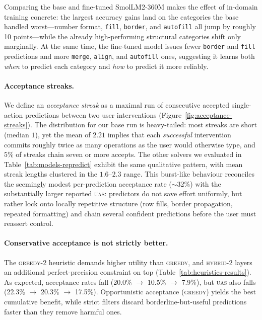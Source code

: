 \documentclass{article}
\newcommand{\op}[1]{\texttt{\small #1}}
\theoremstyle{plain}
\theoremstyle{definition}
\theoremstyle{remark}
\begin{document}
Comparing the base and fine-tuned SmolLM2-360M makes the effect of in-domain training concrete: the largest accuracy gains land on the categories the base handled worst---number format, \op{fill}, \op{border}, and \op{autofill} all jump by roughly 10 points---while the already high-performing structural categories shift only marginally.
At the same time, the fine-tuned model issues fewer \op{border} and \op{fill} predictions and more \op{merge}, \op{align}, and \op{autofill} ones, suggesting it learns both \emph{when} to predict each category and \emph{how} to predict it more reliably.



\paragraph{Acceptance streaks.}
We define an \emph{acceptance streak} as a maximal run of consecutive accepted single-action predictions between two user interventions (Figure~\ref{fig:acceptance-streaks}). The distribution for our base run is heavy-tailed: most streaks are short (median $1$), yet the mean of $2.21$ implies that each \emph{successful} intervention commits roughly twice as many operations as the user would otherwise type, and $5\%$ of streaks chain seven or more accepts. The other solvers we evaluated in Table~\ref{tab:models-repredict} exhibit the same qualitative pattern, with mean streak lengths clustered in the $1.6$--$2.3$ range. This burst-like behaviour reconciles the seemingly modest per-prediction acceptance rate ($\sim$32\%) with the substantially larger reported \textsc{uas}: predictors do not save effort uniformly, but rather lock onto locally repetitive structure (row fills, border propagation, repeated formatting) and chain several confident predictions before the user must reassert control.




\paragraph{Conservative acceptance is not strictly better.}

The \textsc{greedy-2} heuristic demands higher utility than \textsc{greedy}, and \textsc{hybrid-2} layers an additional perfect-precision constraint on top (Table~\ref{tab:heuristics-results}).
As expected, acceptance rates fall (20.0\% $\to$ 10.5\% $\to$ 7.9\%), but \textsc{uas} also falls (22.3\% $\to$ 20.3\% $\to$ 17.5\%).
Opportunistic acceptance (\textsc{greedy}) yields the best cumulative benefit, while strict filters discard borderline-but-useful predictions faster than they remove harmful ones. 
\end{document}
